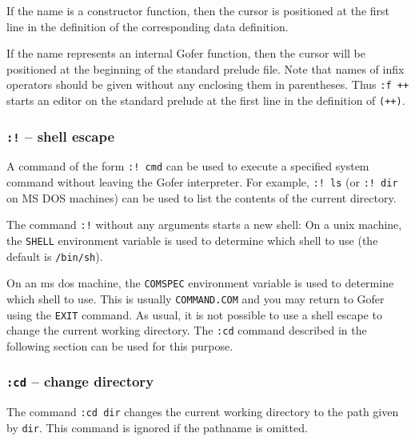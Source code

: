 \IT  If the name is a constructor function, then the cursor is
     positioned at the first line in the definition of the
     corresponding data definition.

\IT  If the name represents an internal Gofer function, then the
     cursor will be positioned at the beginning of the standard
     prelude file.
\EI
Note that names of infix operators should be given without any
enclosing them in parentheses.  Thus \verb":f ++" starts an editor on the
standard prelude at the first line in the definition of \verb"(++)".


\subsubsection{{\tt :!} -- shell escape}
A command of the form \verb":! cmd" can be used to execute a specified
system command without leaving the Gofer interpreter.  For example,
\verb":! ls" (or \verb":! dir" on MS DOS machines) can be used to list the
contents of the current directory.

The command \verb":!" without any arguments starts a new shell:
\BI
\IT  On a unix machine, the \verb"SHELL" environment variable is used to
     determine which shell to use (the default is \verb"/bin/sh").

\IT  On an {\sc ms dos} machine, the \verb"COMSPEC" environment variable is used
     to determine which shell to use.  This is usually \verb"COMMAND.COM"
     and you may return to Gofer using the \verb"EXIT" command.
\EI
As usual, it is not possible to use a shell escape to change the
current working directory.  The \verb":cd" command described in the following
section can be used for this purpose.


\subsubsection{{\tt :cd} -- change directory}
The command \verb":cd dir" changes the current working directory to the path
given by \verb"dir".  This command is ignored if the pathname is omitted.


